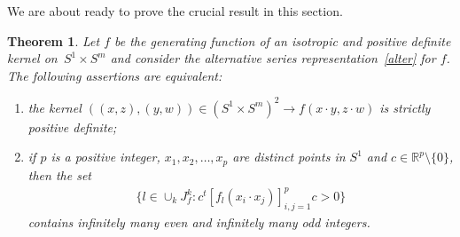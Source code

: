 \documentclass[pdftex]{sigma}
\numberwithin{equation}{section}
\newtheorem{Theorem}{Theorem}[section]
\begin{document}
We are about ready to prove the crucial result in this section.

\begin{Theorem} \label{key}
Let $f$ be the generating function of an isotropic and positive definite kernel on~\mbox{$S^1 \times S^m$} and consider the alternative series representation~\eqref{alter} for $f$. The following assertions are equivalent:
\begin{enumerate}\itemsep=0pt
\item[$(i)$] the kernel $((x,z), (y,w)) \in (S^1 \times S^m)^2 \to f(x \cdot y, z \cdot w)$ is strictly positive definite;
\item[$(ii)$] if $p$ is a positive integer, $x_1, x_2, \ldots, x_p$ are distinct points in $S^1$ and $c\in \mathbb{R}^p\setminus\{0\}$, then the set
\begin{gather*}\big\{l\in \cup_{k}J_f^k \colon c^{t} [f_l(x_i \cdot x_j)]_{i,j=1}^p c>0\big\}\end{gather*}
contains infinitely many even and infinitely many odd integers.
\end{enumerate}
\end{Theorem}
\end{document}
